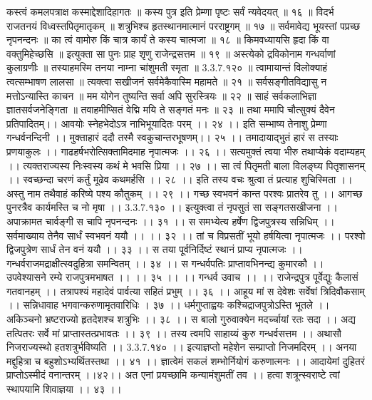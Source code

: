 कस्त्वं कमलपत्राक्ष कस्माद्देशादिहागतः ॥
कस्य पुत्र इति प्रेम्णा पृष्टः सर्वं न्यवेदयत् ॥ १६ ॥
विदर्भ राजतनयं विध्वस्तपितृमातृकम् ॥
शत्रुभिश्च हृतस्थानमात्मानं परराष्ट्रगम् ॥ १७ ॥
सर्वमावेद्य भूयस्तां पप्रच्छ नृपनन्दनः ॥
का त्वं वामोरु किं चात्र कार्यं ते कस्य चात्मजा ॥ १८ ॥
किमवध्यायसि हृदा किं वा वक्तुमिहेच्छसि ॥
इत्युक्ता सा पुनः प्राह शृणु राजेन्द्रसत्तम ॥ १९ ॥
अस्त्येको द्रविकोनाम गन्धर्वाणां कुलाग्रणीः ॥
तस्याहमस्मि तनया नाम्ना चांशुमती स्मृता ॥ 3.3.7.१२० ॥
त्वामायान्तं विलोक्याहं त्वत्सम्भाषण लालसा ॥
त्यक्त्वा सखीजनं सर्वमेकैवास्मि महामते ॥ २१ ॥
सर्वसङ्गीतविद्यासु न मत्तोऽन्यास्ति काचन ॥
मम योगेन तुष्यन्ति सर्वा अपि सुरस्त्रियः ॥ २२ ॥
साहं सर्वकलाभिज्ञा ज्ञातसर्वजनेङ्गिता ॥
तवाहमीप्सितं वेद्मि मयि ते सङ्गतं मनः ॥ २३ ॥
तथा ममापि चौत्सुक्यं दैवेन प्रतिपादितम्।।
आवयोः स्नेहभेदोऽत्र नाभिभूयादितः परम् ।। २४ ।।
इति सम्भाष्य तेनाशु प्रेम्णा गन्धर्वनन्दिनी ।।
मुक्ताहारं ददौ तस्मै स्वकुचान्तरभूषणम्।। २५ ।।
तमादायाद्भुतं हारं स तस्याः प्रणयाकुलः ।।
गाढहर्षभरोत्सिक्तामिदमाह नृपात्मजः ।। २६ ।।
सत्यमुक्तं त्वया भीरु तथाप्येकं वदाम्यहम् ।।
त्यक्तराज्यस्य निःस्वस्य कथं मे भवसि प्रिया ।। २७ ।।
सा त्वं पितृमती बाला विलङ्घ्य पितृशासनम् ।।
स्वच्छन्दा चरणं कर्तुं मूढेव कथमर्हसि ।। २८ ।।
इति तस्य वचः श्रुत्वा तं प्रत्याह शुचिस्मिता ।।
अस्तु नाम तथैवाहं करिष्ये पश्य कौतुकम् ।। २९ ।।
गच्छ स्वभवनं कान्त परश्वः प्रातरेव तु ।।
आगच्छ पुनरत्रैव कार्यमस्ति च नो मृषा ।। 3.3.7.१३० ।।
इत्युक्त्वा तं नृपसुतं सा सङ्गतसखीजना ।।
अपाक्रामत चार्वङ्गी स चापि नृपनन्दनः ।। ३१ ।।
स समभ्येत्य हर्षेण द्विजपुत्रस्य सन्निधिम् ।।
सर्वमाख्याय तेनैव सार्धं स्वभवनं ययौ ।। ।। ३२ ।।
तां च विप्रसतीं भूयो हर्षयित्वा नृपात्मजः ।।
परश्वो द्विजपुत्रेण सार्धं तेन वनं ययौ ।। ३३ ।।
स तया पूर्वनिर्दिष्टं स्थानं प्राप्य नृपात्मजः ।।
गन्धर्वराजमद्राक्षीत्स्वदुहित्रा समन्वितम् ।। ३४ ।।
स गन्धर्वपतिः प्राप्तावभिनन्द्य कुमारकौ ।।
उपवेश्यासने रम्ये राजपुत्रमभाषत ।। ।। ३५ ।।
।। गन्धर्व उवाच ।। ।।
राजेन्द्रपुत्र पूर्वेद्युः कैलासं गतवानहम् ।।
तत्रापश्यं महादेवं पार्वत्या सहितं प्रभुम् ।। ३६ ।।
आहूय मां स देवेशः सर्वेषां त्रिदिवौकसाम् ।।
सन्निधावाह भगवान्करुणामृतवारिधिः । ३७ ।।
धर्मगुप्ताह्वयः कश्चिद्राजपुत्रोऽस्ति भूतले ।।
अकिञ्चनो भ्रष्टराज्यो हृतदेशश्च शत्रुभिः ।। ३८ ।।
स बालो गुरुवाक्येन मदर्च्चायां रतः सदा ।।
अद्य तत्पितरः सर्वे मां प्राप्तास्तत्प्रभावतः ।। ३९ ।।
तस्य त्वमपि साहाय्यं कुरु गन्धर्वसत्तम ।।
अथासौ निजराज्यस्थो हतशत्रुर्भविष्यति ।। 3.3.7.१४० ।।
इत्याज्ञप्तो महेशेन सम्प्राप्तो निजमदिरम् ।।
अनया मद्दुहित्रा च बहुशोऽभ्यर्थितस्तथा ।। ४१ ।।
ज्ञात्वेमं सकलं शम्भोर्नियोगं करुणात्मनः ।।
आदायेमां दुहितरं प्राप्तोऽस्मीदं वनान्तरम् ।।४२।।
अत एनां प्रयच्छामि कन्यामंशुमतीं तव ।।
हत्वा शत्रून्स्वराष्टे त्वां स्थापयामि शिवाज्ञया ।। ४३ ।।
